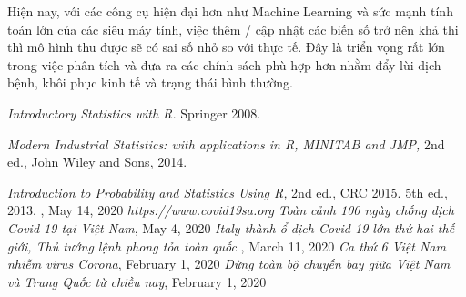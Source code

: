 \documentclass[a4paper]{article}
\begin{document}
Hiện nay, với các công cụ hiện đại hơn như Machine Learning và sức mạnh tính toán lớn của các siêu máy tính, việc thêm / cập nhật các biến số trở nên khả thi thì mô hình thu được sẽ có sai số nhỏ so với thực tế. Đây là triển vọng rất lớn trong việc phân tích và đưa ra các chính sách phù hợp hơn nhằm đẩy lùi dịch bệnh, khôi phục kinh tế và trạng thái bình thường.


\newpage
{}
\begin{thebibliography}{99999}
 {\em Introductory Statistics with R.}  Springer 2008.

{\em Modern Industrial Statistics: with applications in R, MINITAB and JMP,} 2nd ed.,  John Wiley and Sons, 2014.

{\em Introduction to Probability and Statistics Using R,} 2nd ed., CRC 2015.
 5th ed., 2013.
, May 14, 2020
{\em https://www.covid19sa.org}
{\em Toàn cảnh 100 ngày chống dịch Covid-19 tại Việt Nam}, May 4, 2020 
{\em Italy thành ổ dịch Covid-19 lớn thứ hai thế giới, Thủ tướng lệnh phong tỏa toàn quốc }, March 11, 2020
{\em Ca thứ 6 Việt Nam nhiễm virus Corona}, February 1, 2020 
{\em Dừng toàn bộ chuyến bay giữa Việt Nam và Trung Quốc từ chiều nay}, February 1, 2020 
\end{thebibliography}
\end{document}

